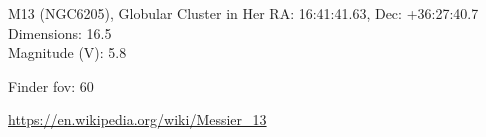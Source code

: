 \begin{block}{M13 (NGC6205), Globular Cluster in Her}
    RA: 16:41:41.63, Dec: +36:27:40.7 \\ 
    Dimensions: 16.5 \\ 
    Magnitude (V): 5.8



    Finder fov: 60 

    \url{https://en.wikipedia.org/wiki/Messier_13} 
\end{block}